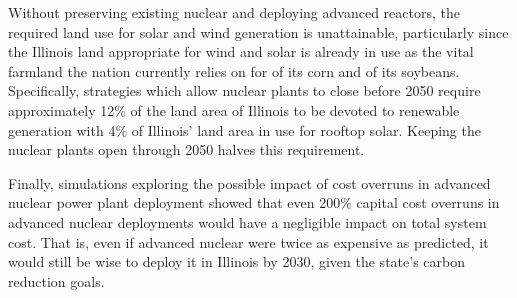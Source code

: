 Without preserving existing nuclear and deploying advanced reactors, the 
required land use for solar and wind generation is 
unattainable, particularly since the Illinois land appropriate for wind and solar 
is already in use as the vital farmland the nation currently relies on for  of its 
corn and  of its soybeans.
Specifically, strategies which allow nuclear plants to close before 2050 
require approximately 12\% of the land area of Illinois to be devoted to 
renewable generation  with  4\% of Illinois' land area in use for rooftop solar. 
Keeping the nuclear plants open through 2050 halves this requirement.

Finally, simulations exploring the possible impact of cost overruns in advanced nuclear power 
plant deployment showed that even 200\% capital cost overruns in advanced 
nuclear deployments would have a negligible impact on total system cost.
That is, even if advanced nuclear were twice as expensive as predicted, it 
would still be wise to deploy it in Illinois by 2030, given the state's carbon 
reduction goals.


